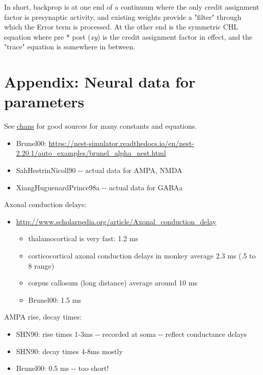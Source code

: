 \documentclass[11pt,twoside]{article}
\newif\myifpdf
\begin{document}
In short, backprop is at one end of a continuum where the only credit
assignment factor is presynaptic activity, and existing weights provide
a "filter" through which the Error term is processed. At the other end
is the symmetric CHL equation where pre * post (\emph{xy}) is the credit
assignment factor in effect, and the "trace" equation is somewhere in
between.

\hypertarget{appendix-neural-data-for-parameters}{%
\section{Appendix: Neural data for
parameters}\label{appendix-neural-data-for-parameters}}

See \href{https://github.com/emer/axon/tree/master/chans}{chans} for
good sources for many constants and equations.

\begin{itemize}
\tightlist
\item
  Brunel00:
  \url{https://nest-simulator.readthedocs.io/en/nest-2.20.1/auto_examples/brunel_alpha_nest.html}
\item
  SahHestrinNicoll90 -\/- actual data for AMPA, NMDA
\item
  XiangHuguenardPrince98a -\/- actual data for GABAa
\end{itemize}

Axonal conduction delays:

\begin{itemize}
\tightlist
\item
  \url{http://www.scholarpedia.org/article/Axonal_conduction_delay}

  \begin{itemize}
  \tightlist
  \item
    thalamocortical is very fast: 1.2 ms
  \item
    corticocortical axonal conduction delays in monkey average 2.3 ms
    (.5 to 8 range)
  \item
    corpus callosum (long distance) average around 10 ms
  \item
    Brunel00: 1.5 ms
  \end{itemize}
\end{itemize}

AMPA rise, decay times:

\begin{itemize}
\tightlist
\item
  SHN90: rise times 1-3ms -\/- recorded at soma -\/- reflect conductance
  delays
\item
  SHN90: decay times 4-8ms mostly
\item
  Brunel00: 0.5 ms -\/- too short!
\end{itemize}
\end{document}
